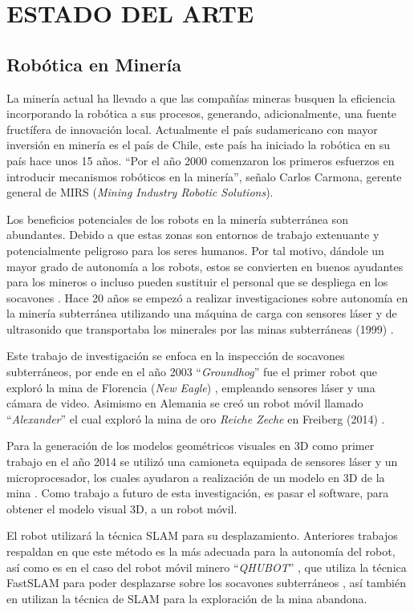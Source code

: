 \chapter{ESTADO DEL ARTE}

\section{Robótica en Minería}
La minería actual ha llevado a que las compañías mineras busquen la eficiencia incorporando la robótica a sus procesos, generando, adicionalmente, una fuente fructífera de innovación local. Actualmente el país sudamericano con mayor inversión en minería es el país de Chile, este país ha iniciado la robótica en su país hace unos 15 años. “Por el año 2000 comenzaron los primeros esfuerzos en introducir mecanismos robóticos en la minería”, señalo Carlos Carmona, gerente general de MIRS (\textit{Mining Industry Robotic Solutions})\cite{Carmona2014}.

Los beneficios potenciales de los robots en la minería subterránea son abundantes. Debido a que estas zonas son entornos de trabajo extenuante y potencialmente peligroso para los seres humanos. Por tal motivo, dándole un mayor grado de autonomía a los robots, estos se convierten en buenos ayudantes para los mineros o incluso pueden sustituir el personal que se despliega en los socavones \cite{Carmona2014}. Hace 20 años se empezó a realizar investigaciones sobre autonomía en la minería subterránea utilizando una máquina de carga con sensores láser y de ultrasonido que transportaba los minerales por las minas subterráneas (1999) \cite{Scheding1999}. 

Este trabajo  de investigación  se enfoca en la inspección de socavones subterráneos, por ende en el año 2003 “\textit{Groundhog}” fue el primer robot que exploró la mina de Florencia (\textit{New Eagle}) \cite{Thrun2004}, empleando sensores láser y una cámara de video. Asimismo en Alemania se creó un robot móvil llamado “\textit{Alexander}” el cual exploró la mina de oro \textit{Reiche Zeche} en Freiberg (2014) \cite{Grehl2015}.

Para la generación de los modelos geométricos visuales en 3D como primer trabajo en el año 2014 se utilizó una camioneta equipada de sensores láser y un microprocesador, los cuales ayudaron a realización de un modelo en 3D de la mina \cite{Zlot2014}. Como trabajo a futuro de esta investigación, es pasar el software, para obtener el modelo visual 3D, a un robot móvil.
 
El robot utilizará la técnica SLAM para su desplazamiento. Anteriores trabajos respaldan en que este método es la más adecuada para la autonomía del robot, así como es en el caso del robot móvil minero “\textit{QHUBOT}” , que utiliza la técnica FastSLAM para poder desplazarse sobre los socavones subterráneos \cite{Mauricio2015}, así también en \cite{Thrun2004} utilizan la técnica de SLAM para la exploración de la mina abandona. 

